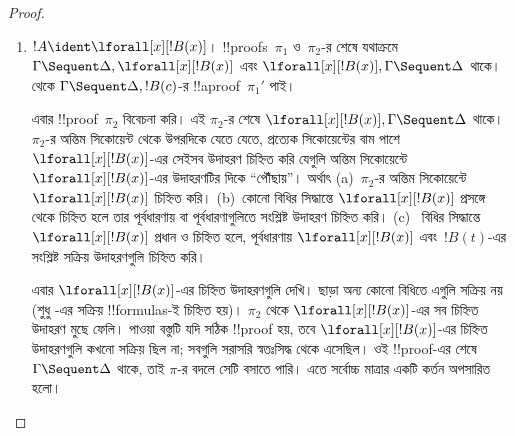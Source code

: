 \documentclass[../../../include/open-logic-section]{subfiles}
\begin{document}
\begin{proof}
\begin{enumerate}
  $!C,!B,\Gamma\Sequent\Delta$-র !!a{proof}~$\pi_2'''$-ও পাই।
  !!{proof}~$\pi'$ হলো:
  \[
  \AxiomC{}
  \RightLabel{$\pi_2'$}
  \Deduce$\Gamma \fCenter \Delta, !B$
  \AxiomC{}
  \RightLabel{$\pi_1'$}
  \Deduce$!B, \Gamma \fCenter \Delta, !C$
  \AxiomC{}
  \RightLabel{$\pi_2'''$}
  \Deduce$!C, !B, \Gamma \fCenter \Delta$
  \RightLabel{\CutCS}
  \BinaryInf$!B, \Gamma \fCenter \Delta$
  \RightLabel{\CutCS}
  \BinaryInf$\Gamma \fCenter \Delta$
  \DisplayProof
  \]
  \item $!A \ident \lforall[x][!B(x)]$। !!{proof}s~$\pi_1$ ও~$\pi_2$-র
  শেষে যথাক্রমে $\Gamma \Sequent \Delta, \lforall[x][!B(x)]$ এবং
  $\lforall[x][!B(x)], \Gamma \Sequent \Delta$ থাকে।
   থেকে
  $\Gamma\Sequent\Delta,!B(c)$-র !!a{proof}~$\pi_1'$ পাই।

  এবার !!{proof}~$\pi_2$ বিবেচনা করি। এই $\pi_2$-র শেষে
  $\lforall[x][!B(x)],\Gamma\Sequent\Delta$ থাকে।
  $\pi_2$-র অন্তিম সিকোয়েন্ট থেকে উপরদিকে যেতে যেতে, প্রত্যেক
  সিকোয়েন্টের বাম পাশে $\lforall[x][!B(x)]$-এর সেইসব উদাহরণ
  চিহ্নিত করি যেগুলি অন্তিম সিকোয়েন্টে
  $\lforall[x][!B(x)]$-এর উদাহরণটির দিকে
  ``পৌঁছায়''। অর্থাৎ (a)~$\pi_2$-র অন্তিম সিকোয়েন্টে
  $\lforall[x][!B(x)]$ চিহ্নিত করি। (b)~কোনো বিধির সিদ্ধান্তে
  $\lforall[x][!B(x)]$ প্রসঙ্গে থেকে চিহ্নিত হলে তার
  পূর্বধারণায় বা পূর্বধারণাগুলিতে সংশ্লিষ্ট উদাহরণ চিহ্নিত করি।
  (c)~\LeftR{\lforall} বিধির সিদ্ধান্তে
  $\lforall[x][!B(x)]$ প্রধান ও চিহ্নিত হলে, পূর্বধারণায়
  $\lforall[x][!B(x)]$ এবং~$!B(t)$-এর সংশ্লিষ্ট সক্রিয় উদাহরণগুলি
  চিহ্নিত করি।

  এবার $\lforall[x][!B(x)]$-এর চিহ্নিত উদাহরণগুলি দেখি।
  \LeftR{\lforall} ছাড়া অন্য কোনো বিধিতে এগুলি সক্রিয় নয়
  (শুধু \LeftR{\lforall}-এর সক্রিয় !!{formula}s-ই চিহ্নিত হয়)।
  $\pi_2$ থেকে $\lforall[x][!B(x)]$-এর সব চিহ্নিত উদাহরণ মুছে
  ফেলি। পাওয়া বস্তুটি যদি সঠিক !!{proof} হয়, তবে
  $\lforall[x][!B(x)]$-এর চিহ্নিত উদাহরণগুলি কখনো সক্রিয় ছিল না;
  সবগুলি সরাসরি স্বতঃসিদ্ধ থেকে
  এসেছিল। ওই !!{proof}-এর শেষে~$\Gamma\Sequent\Delta$ থাকে,
  তাই $\pi$-র বদলে সেটি বসাতে পারি। এতে সর্বোচ্চ মাত্রার একটি
  কর্তন অপসারিত হলো।


\end{enumerate}
\end{proof}
\end{document}
